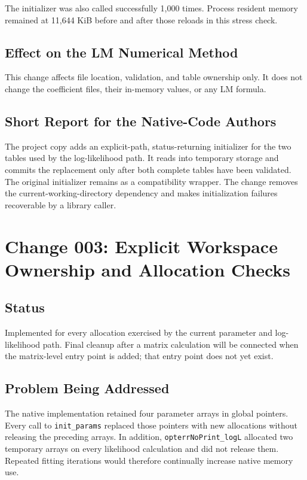 \documentclass[11pt,a4paper]{article}
\begin{document}
The initializer was also called successfully 1,000 times. Process resident
memory remained at 11,644 KiB before and after those reloads in this stress
check.

\subsection{Effect on the LM Numerical Method}

This change affects file location, validation, and table ownership only. It
does not change the coefficient files, their in-memory values, or any LM
formula.

\subsection{Short Report for the Native-Code Authors}

The project copy adds an explicit-path, status-returning initializer for the two
tables used by the log-likelihood path. It reads into temporary storage and
commits the replacement only after both complete tables have been validated.
The original initializer remains as a compatibility wrapper. The change removes
the current-working-directory dependency and makes initialization failures
recoverable by a library caller.

\section{Change 003: Explicit Workspace Ownership and Allocation Checks}

\subsection{Status}

Implemented for every allocation exercised by the current parameter and
log-likelihood path. Final cleanup after a matrix calculation will be connected
when the matrix-level entry point is added; that entry point does not yet exist.

\subsection{Problem Being Addressed}

The native implementation retained four parameter arrays in global pointers.
Every call to \texttt{init\_params} replaced those pointers with new allocations
without releasing the preceding arrays. In addition,
\texttt{opterrNoPrint\_logL} allocated two temporary arrays on every likelihood
calculation and did not release them. Repeated fitting iterations would
therefore continually increase native memory use.
\end{document}
